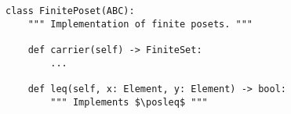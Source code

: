 \begin{verbatim}
class FinitePoset(ABC):
    """ Implementation of finite posets. """

    def carrier(self) -> FiniteSet:
        ...

    def leq(self, x: Element, y: Element) -> bool:
        """ Implements $\posleq$ """
\end{verbatim}